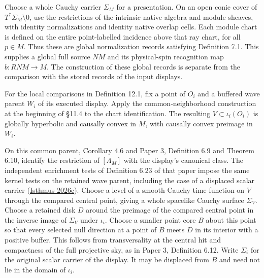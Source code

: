 \documentclass[
  english,
  11pt,
  reqno]{amsart}
\begin{document}
Choose a whole Cauchy carrier \(\Sigma_M\) for a presentation. On an
open conic cover of \(T^*\Sigma_M\setminus0\), use the restrictions of
the intrinsic native algebra and module sheaves, with identity
normalizations and identity native overlap cells. Each module chart is
defined on the entire point-labelled incidence above that ray chart, for
all \(p\in M\). Thus these are global normalization records satisfying
Definition 7.1. This supplies a global full source \(N M\) and its
physical-spin recognition map \(b:RN M\to M\). The construction of these
global records is separate from the comparison with the stored records
of the input displays.

For the local comparisons in Definition 12.1, fix a point of \(O_i\) and
a buffered wave parent \(W_i\) of its executed display. Apply the
common-neighborhood construction at the beginning of §11.4 to the chart
identification. The resulting \(V\subset\iota_i(O_i)\) is globally
hyperbolic and causally convex in \(M\), with causally convex preimage
in \(W_i\).

On this common parent, Corollary 4.6 and Paper 3, Definition 6.9 and
Theorem 6.10, identify the restriction of \([\Lambda_M]\) with the
display's canonical class. The independent enrichment tests of
Definition 6.23 of that paper impose the same kernel tests on the
retained wave parent, including the case of a displaced scalar carrier
(\hyperref[ref-IsthmusSmooth2026]{Isthmus 2026c}). Choose a level of a
smooth Cauchy time function on \(V\) through the compared central point,
giving a whole spacelike Cauchy surface \(\Sigma_V\). Choose a retained
disk \(D\) around the preimage of the compared central point in the
inverse image of \(\Sigma_V\) under \(\iota_i\). Choose a smaller point
core \(B\) about this point so that every selected null direction at a
point of \(B\) meets \(D\) in its interior with a positive buffer. This
follows from transversality at the central hit and compactness of the
full projective sky, as in Paper 3, Definition 6.12. Write \(\Sigma_i\)
for the original scalar carrier of the display. It may be displaced from
\(B\) and need not lie in the domain of \(\iota_i\).
\end{document}
